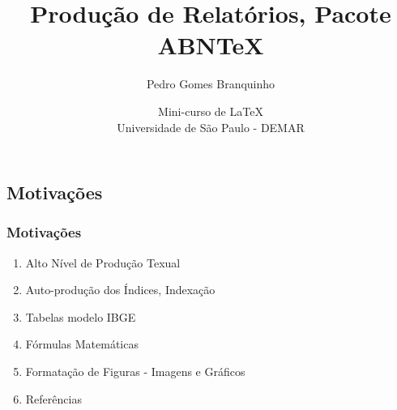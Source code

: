 \documentclass{beamer}
\title[Relatórios]{\Huge{Produção de Relatórios, Pacote ABNTeX}}
\author[Branquinho]{Pedro Gomes Branquinho \\
	  \text{\scriptsize{pedro.branquinho@usp.br}}}
\date[ABNTeX]{\scriptsize{Mini-curso de \LaTeX \\ Universidade de São Paulo - DEMAR}}
\begin{document}
	{
	  \begin{frame}
	    \titlepage
	  \end{frame}
	}



	\begin{frame}
	  \section{Motivações}
	  \frametitle{Motivações}

	  \begin{enumerate}
	  \item<1->{Alto Nível de Produção Texual}
	  \item<3->{Auto-produção dos Índices, Indexação}
	  \item<2->{Tabelas modelo IBGE}
	  \item<4->{Fórmulas Matemáticas}
	  \item<6->{Formatação de Figuras - Imagens e Gráficos}
	  \item<5->{Referências}
	  \end{enumerate}

	\end{frame}
\end{document}
